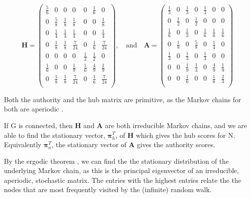 \documentclass[11pt]{report}
\begin{document}
\begin{equation}
\textbf{H}=\left(
\begin{array}{ccccccc}
\frac{5}{6} & 0 & 0 & 0 & 0 & \frac{1}{6} & 0 \\
0 & \frac{5}{8} & \frac{1}{8} & \frac{1}{8} & 0 & 0 & \frac{1}{8} \\
0 & \frac{1}{4} & \frac{1}{4} & \frac{1}{4} & 0 & 0 & \frac{1}{4} \\
0 & \frac{1}{8} & \frac{1}{8} & \frac{7}{24} & 0 & \frac{1}{6} & \frac{7}{24} \\
0 & 0 & 0 & 0 & \frac{1}{2} & \frac{1}{2} & 0\\
\frac{1}{6} & 0 & 0 & \frac{1}{9} & \frac{1}{6} & \frac{4}{9} & \frac{1}{9} \\
0 & \frac{1}{8} & \frac{1}{8} & \frac{7}{24} & 0 & \frac{1}{6} & \frac{7}{24} \\
\end{array}
\right)
\mathrm{,}\quad\mathrm{and}\quad
\textbf{A}=\left(
\begin{array}{ccccccc}
\frac{1}{3} & 0 & \frac{1}{3} & 0 & \frac{1}{3} & 0 & 0 \\
0 & \frac{1}{2} & 0 & \frac{1}{2} & 0 & 0 & 0 \\
\frac{1}{6} & 0 & \frac{1}{3} & 0 & \frac{1}{6} & \frac{1}{6} & \frac{1}{6} \\
0 & \frac{1}{8} & 0 & \frac{5}{8} & 0 & \frac{1}{4} & 0 \\
\frac{1}{3} & 0 & \frac{1}{3} & 0 & \frac{1}{3} & 0 & 0 \\
0 & 0 & \frac{1}{9} & \frac{1}{3} & 0 & \frac{4}{9} & \frac{1}{9} \\
0 & 0 & \frac{1}{6} & 0 & 0 & \frac{1}{6} & \frac{2}{3} \\
\end{array}
\right)
\end{equation}

Both the authority and the hub matrix are primitive, as the Markov chains for both are aperiodic \cite{lempel2000stochastic}. 

If G is connected, then \textbf{H} and \textbf{A} are both irreducible Markov chains, and we are able to find the stationary vector, $\boldsymbol\pi_h^T$, of \textbf{H} which gives the hub scores for N. Equivalently $\boldsymbol\pi_a^T$, the stationary vector of \textbf{A} gives the authority scores.  

By the ergodic theorem \cite{gallager1992discrete}, we can find the  the stationary distribution of the underlying Markov chain, as this is the principal eigenvector of an irreducible, aperiodic, stochastic matrix. The entries with the highest entries relate the the nodes that are most frequently visited by the (infinite) random walk. 
\end{document}
